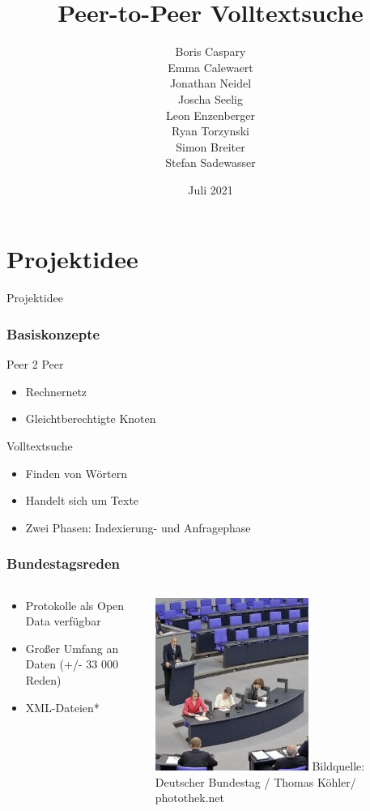 \documentclass{beamer}
\title{Peer-to-Peer Volltextsuche}
\subtitle{}
\author{
  Boris Caspary \\
  Emma Calewaert \\
  Jonathan Neidel \\
  Joscha Seelig \\
  Leon Enzenberger \\
  Ryan Torzynski \\
  Simon Breiter \\
  Stefan Sadewasser \\
}
\date{Juli 2021}
\institute{HTW Berlin, Angewandte Informatik, Projektstudium bei Herr Hoppe}
\begin{document}
\frame{\titlepage}

\section{Projektidee}
\begin{frame}
  \begin{center}
    {\Huge Projektidee}
  \end{center}
\end{frame}

\begin{frame}[allowframebreaks]
  \frametitle{Basiskonzepte}
  Peer 2 Peer
  \begin{itemize}
    \item Rechnernetz
    \item Gleichtberechtigte Knoten
  \end{itemize}

  \break
  Volltextsuche
    \begin{itemize}
    \item Finden von Wörtern
    \item Handelt sich um Texte
    \item Zwei Phasen: Indexierung- und Anfragephase
  \end{itemize}
\end{frame}

\begin{frame}
  \frametitle{Bundestagsreden}
  \begin{columns}
    \begin{column}{0.5\textwidth}
      \begin{itemize}
        \item Protokolle als Open Data verfügbar
        \item Großer Umfang an Daten (+/- 33 000 Reden)
        \item XML-Dateien*
      \end{itemize}
    \end{column}
    \begin{column}{0.5\textwidth}
      \includegraphics[width=5cm]{BundestagProtokoll}
      {\tiny Bildquelle: Deutscher Bundestag / Thomas Köhler/ photothek.net}
    \end{column}
  \end{columns}
\end{frame}
\end{document}
